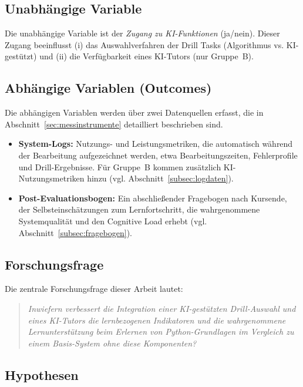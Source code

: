 \subsection{Unabhängige Variable}\label{subsec:uv}

Die unabhängige Variable ist der \textit{Zugang zu KI-Funktionen} (ja/nein). Dieser Zugang beeinflusst (i) das Auswahlverfahren der Drill Tasks (Algorithmus vs. KI-gestützt) und (ii) die Verfügbarkeit eines KI-Tutors (nur Gruppe~B).

\subsection{Abhängige Variablen (Outcomes)}\label{subsec:avs}

Die abhängigen Variablen werden über zwei Datenquellen erfasst, die in Abschnitt~\ref{sec:messinstrumente} detailliert beschrieben sind.

\begin{itemize}
    \item \textbf{System-Logs:} Nutzungs- und Leistungsmetriken, die automatisch während der Bearbeitung aufgezeichnet werden, etwa Bearbeitungszeiten, Fehlerprofile und Drill-Ergebnisse. Für Gruppe~B kommen zusätzlich KI-Nutzungsmetriken hinzu (vgl. Abschnitt~\ref{subsec:logdaten}).
    \item \textbf{Post-Evaluationsbogen:} Ein abschließender Fragebogen nach Kursende, der Selbsteinschätzungen zum Lernfortschritt, die wahrgenommene Systemqualität und den Cognitive Load erhebt (vgl. Abschnitt~\ref{subsec:fragebogen}).
\end{itemize}

\subsection{Forschungsfrage}\label{subsec:forschungsfrage}

Die zentrale Forschungsfrage dieser Arbeit lautet:

\begin{quote}
\textit{Inwiefern verbessert die Integration einer KI-gestützten Drill-Auswahl und eines KI-Tutors die lernbezogenen Indikatoren und die wahrgenommene Lernunterstützung beim Erlernen von Python-Grundlagen im Vergleich zu einem Basis-System ohne diese Komponenten?}
\end{quote}

\subsection{Hypothesen}\label{subsec:hypothesen}

